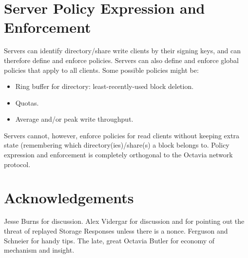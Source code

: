\documentclass[letterpaper,9pt,twocolumn]{article}
\begin{document}
\section{Server Policy Expression and Enforcement}

Servers can identify directory/share write clients by their signing keys,
and can therefore define and enforce policies. Servers can also define and
enforce global policies that apply to all clients. Some possible policies
might be:

\begin{itemize}

\item Ring buffer for directory: least-recently-used block deletion.

\item Quotas.

\item Average and/or peak write throughput.

\end{itemize}

Servers cannot, however, enforce policies for read clients without keeping
extra state (remembering which directory(ies)/share(s) a block belongs to.
Policy expression and enforcement is completely orthogonal to the Octavia
network protocol.


\section{Acknowledgements}

Jesse Burns for discussion. Alex Vidergar for discussion and for pointing
out the threat of replayed Storage Responses unless there is a nonce.
Ferguson and Schneier for handy tips. The late, great Octavia Butler for
economy of mechanism and insight.
\end{document}
